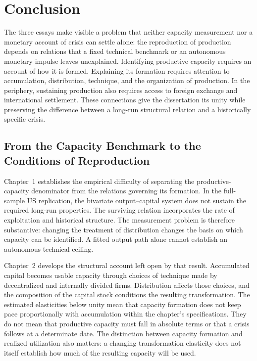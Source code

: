 \chapter*{Conclusion}

The three essays make visible a problem that neither capacity measurement nor a monetary account of crisis can settle alone: the reproduction of production depends on relations that a fixed technical benchmark or an autonomous monetary impulse leaves unexplained. Identifying productive capacity requires an account of how it is formed. Explaining its formation requires attention to accumulation, distribution, technique, and the organization of production. In the periphery, sustaining production also requires access to foreign exchange and international settlement. These connections give the dissertation its unity while preserving the difference between a long-run structural relation and a historically specific crisis.

\section*{From the Capacity Benchmark to the Conditions of Reproduction}

Chapter~1 establishes the empirical difficulty of separating the productive-capacity denominator from the relations governing its formation. In the full-sample US replication, the bivariate output--capital system does not sustain the required long-run properties. The surviving relation incorporates the rate of exploitation and historical structure. The measurement problem is therefore substantive: changing the treatment of distribution changes the basis on which capacity can be identified. A fitted output path alone cannot establish an autonomous technical ceiling.

Chapter~2 develops the structural account left open by that result. Accumulated capital becomes usable capacity through choices of technique made by decentralized and internally divided firms. Distribution affects those choices, and the composition of the capital stock conditions the resulting transformation. The estimated elasticities below unity mean that capacity formation does not keep pace proportionally with accumulation within the chapter's specifications. They do not mean that productive capacity must fall in absolute terms or that a crisis follows at a determinate date. The distinction between capacity formation and realized utilization also matters: a changing transformation elasticity does not itself establish how much of the resulting capacity will be used.

